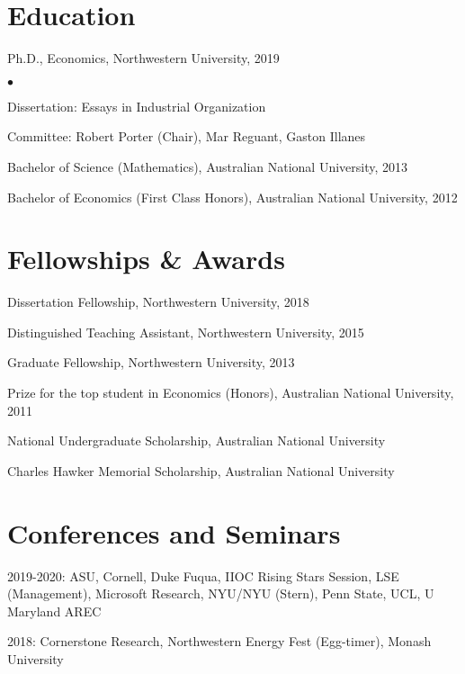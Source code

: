 \documentclass[margin,line]{res}
\newenvironment{list1}{
  \begin{list}{\ding{113}}{%
      \setlength{\itemsep}{.025in}
      \setlength{\parsep}{0in} \setlength{\parskip}{0in}
      \setlength{\topsep}{0in} \setlength{\partopsep}{0in}
      \setlength{\leftmargin}{0.17in}}}{\end{list}}
\newenvironment{list2}{
  \begin{list}{$\bullet$}{%
      \setlength{\itemsep}{0in}
      \setlength{\parsep}{0in} \setlength{\parskip}{0in}
      \setlength{\topsep}{0in} \setlength{\partopsep}{0in}
      \setlength{\leftmargin}{0.2in}}}{\end{list}}
\begin{document}
\begin{resume}
\section{ Education}\begin{tiny}

\end{tiny}
\begin{list1}
\item[] Ph.D., Economics, Northwestern University, 2019
	\begin{list2}
		\item[] Dissertation: Essays in Industrial Organization
		\item[] Committee: Robert Porter (Chair), Mar Reguant, Gaston Illanes
	\end{list2}
\item[] Bachelor of Science (Mathematics), Australian National University, 2013
\item[] Bachelor of Economics (First Class Honors), Australian National University, 2012
\end{list1}

\section{Fellowships \& Awards}
\begin{list1}
\item[] Dissertation Fellowship, Northwestern University, 2018
\item[] Distinguished Teaching Assistant, Northwestern University, 2015
\item[] Graduate Fellowship, Northwestern University, 2013
\item[] Prize for the top student in Economics (Honors), Australian National University, 2011
\item[] National Undergraduate Scholarship, Australian National University
\item[] Charles Hawker Memorial Scholarship, Australian National University
\end{list1}

\section{ Conferences and Seminars}
\begin{list1}
\item[] 2019-2020: ASU, Cornell, Duke Fuqua, IIOC Rising Stars Session, LSE (Management), Microsoft Research, NYU/NYU (Stern), Penn State, UCL, U Maryland AREC
\item[] 2018:  Cornerstone Research, Northwestern Energy Fest (Egg-timer), Monash University
\end{list1}


\end{resume}
\end{document}
